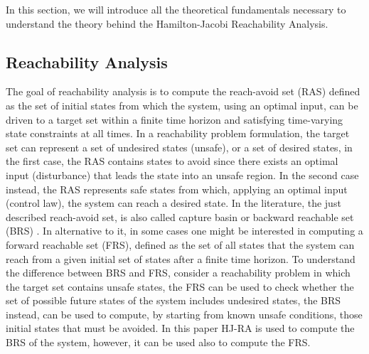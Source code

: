 In this section, we will introduce all the theoretical fundamentals necessary to understand the theory behind the Hamilton-Jacobi Reachability Analysis.

\subsection{Reachability Analysis}
The goal of reachability analysis is to compute the reach-avoid set (RAS) defined as the set of initial states from which the system, using an optimal input, can be driven to a target set within a finite time horizon and satisfying time-varying state constraints at all times. In a reachability problem formulation, the target set can represent a set of undesired states (unsafe), or a set of desired states, in the first case, the RAS contains states to avoid since there exists an optimal input (disturbance) that leads the state into an unsafe region. In the second case instead, the RAS represents safe states from which, applying an optimal input (control law), the system can reach a desired state. 
In the literature, the just described reach-avoid set, is also called capture basin \cite{new_paper} or backward reachable set (BRS) \cite{brief_intro}. In alternative to it, in some cases one might be interested in computing a forward reachable set (FRS), defined as the set of all states that the system can reach from a given initial set of states after a finite time horizon. To understand the difference between BRS and FRS, consider a reachability problem in which the target set contains unsafe states, the FRS can be used to check whether the set of possible future states of the system includes undesired states, the BRS instead, can be used to compute, by starting from known unsafe conditions, those initial states that must be avoided. In this paper HJ-RA is used to compute the BRS of the system, however, it can be used also to compute the FRS. 
